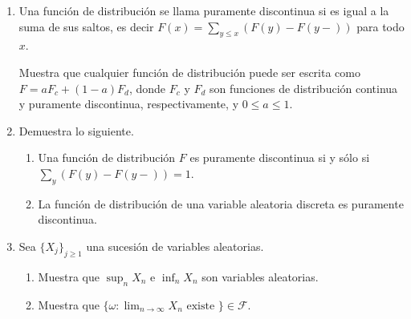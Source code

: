 \documentclass{article}
\begin{document}
\begin{enumerate}
    \item Una función de distribución se llama puramente discontinua si es igual a la suma de sus saltos, es decir $F(x) = \sum_{y\le x}(F(y)-F(y-))$ para todo $x$.
    
    Muestra que cualquier función de distribución puede ser escrita como $F=aF_c + (1-a)F_d$, donde $F_c$ y $F_d$ son funciones de distribución continua y puramente discontinua, respectivamente, y $0\le a \le 1$.

    \item Demuestra lo siguiente.
    
    \begin{enumerate}
        \item Una función de distribución $F$ es puramente discontinua si y sólo si $\sum_y (F(y) - F(y-)) = 1$.
        \item La función de distribución de una variable aleatoria discreta es puramente discontinua.
    \end{enumerate}

    \item Sea $\{ X_j \}_{j\ge 1}$ una sucesión de variables aleatorias.
    
    \begin{enumerate}
        \item Muestra que $\sup_n X_n$ e $\inf_n X_n$ son variables aleatorias.
        \item Muestra que $\{\omega : \lim_{n\to\infty} X_n\text{ existe }\} \in \mathscr F$.
    \end{enumerate}

\end{enumerate}
\end{document}
